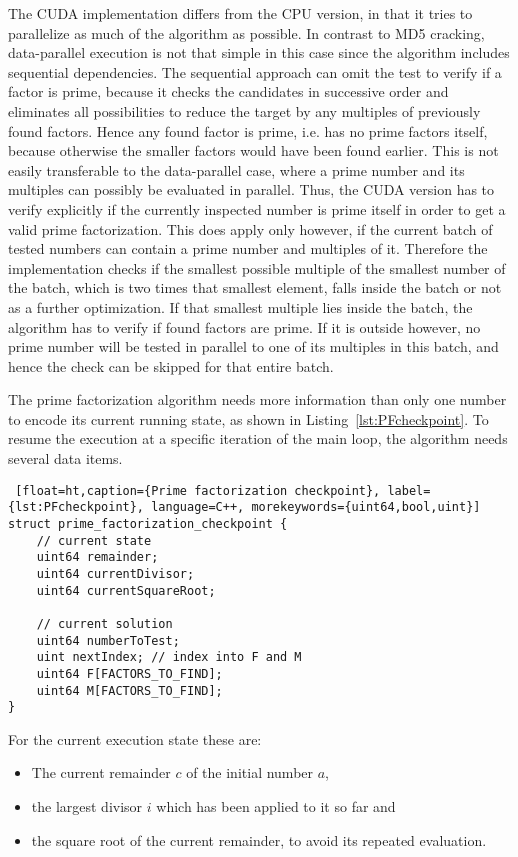 The CUDA implementation differs from the CPU version, in that it tries to parallelize as much of the algorithm as possible. In contrast to MD5 cracking, data-parallel execution is not that simple in this case since the algorithm includes sequential dependencies. The sequential approach can omit the test to verify if a factor is prime, because it checks the candidates in successive order and eliminates all possibilities to reduce the target by any multiples of previously found factors. Hence any found factor is prime, i.e. has no prime factors itself, because otherwise the smaller factors would have been found earlier. This is not easily transferable to the data-parallel case, where a prime number and its multiples can possibly be evaluated in parallel. Thus, the CUDA version has to verify explicitly if the currently inspected number is prime itself in order to get a valid prime factorization. This does apply only however, if the current batch of tested numbers can contain a prime number and multiples of it. Therefore the implementation checks if the smallest possible multiple of the smallest number of the batch, which is two times that smallest element, falls inside the batch or not as a further optimization. If that smallest multiple lies inside the batch, the algorithm has to verify if found factors are prime. If it is outside however, no prime number will be tested in parallel to one of its multiples in this batch, and hence the check can be skipped for that entire batch.

The prime factorization algorithm needs more information than only one number to encode its current running state, as shown in Listing~\ref{lst:PFcheckpoint}. To resume the execution at a specific iteration of the main loop, the algorithm needs several data items.

\begin{lstlisting} [float=ht,caption={Prime factorization checkpoint}, label={lst:PFcheckpoint}, language=C++, morekeywords={uint64,bool,uint}]
struct prime_factorization_checkpoint {
	// current state
	uint64 remainder;
	uint64 currentDivisor;
	uint64 currentSquareRoot;
	
	// current solution
	uint64 numberToTest;
	uint nextIndex; // index into F and M
	uint64 F[FACTORS_TO_FIND];
	uint64 M[FACTORS_TO_FIND];
}
\end{lstlisting} 

For the current execution state these are:
\begin{samepage}
\begin{itemize}
	\item The current remainder $c$ of the initial number $a$,
	\item the largest divisor $i$ which has been applied to it so far and
	\item the square root of the current remainder, to avoid its repeated evaluation.
\end{itemize}
\end{samepage}

